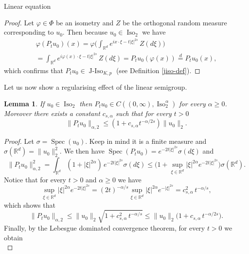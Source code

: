 \documentclass[a4paper,10pt,fleqn]{amsart}
\newtheorem{lemma}[theorem]{Lemma}
\theoremstyle{remark}
\theoremstyle{definition}
\DeclareMathOperator{\Iso}{Iso}
\DeclareMathOperator{\JIso}{J-Iso}
\DeclareMathOperator{\Spec}{Spec}
\newcommand{\X} {{\mathbb{R}^d}}
\renewcommand{\phi} {\varphi}
\renewcommand{\=} {\overset{d}{=}}
\begin{document}
\begin{section}{Linear equation}
\begin{proof}
      Let $\phi\in\Phi$ be an isometry and $Z$ be the orthogonal random measure corresponding to $u_0$. Then
      because $u_0\in\Iso_2$ we have
      \begin{multline*}
        \phi(P_tu_0)(x) = \phi\Big(\int_\X e^{ix\cdot\xi-t|\xi|^{2s}}\,Z(d\xi)\Big) \\=
        \int_\X e^{i\phi(x)\cdot\xi-t|\xi|^{2s}}\,Z(d\xi)  = P_t u_0(\phi(x)) \= P_t u_0(x),
      \end{multline*}
      which confirms that $P_tu_0\in\JIso_{K,p}$ (see Definition \ref{jiso-def}).
  \end{proof}
  Let us now show a regularising effect of the linear semigroup.
   \begin{lemma}\label{linear-regularity}
       If $u_0\in\Iso_2$ then $P_tu_0\in C((0,\infty),\Iso^\alpha_2)$ for every $\alpha\geq 0$. Moreover
       there exists a constant $c_{s,\alpha}$ such that for every $t>0$
       \begin{equation*}
        \|P_tu_0\|_{\alpha,2}\leq (1+c_{s,\alpha}t^{-\alpha/2s})\|u_0\|_{2}.
       \end{equation*}
      \end{lemma}
      \begin{proof}
        Let $\sigma = \Spec(u_0)$. Keep in mind it is a finite measure and $\sigma(\X) = \|u_0\|_2^2$.
        We then have $\Spec(P_tu_0) =  e^{-2t|\xi|^{2s}}\sigma(d\xi)$ and
        \begin{equation*}
          \|P_tu_0\|_{\alpha,2}^2 = \int_\X (1+|\xi|^{2\alpha})\, e^{-2t|\xi|^{2s}} \sigma(d\xi) 
          \leq \big(1+\sup_{\xi\in\X}|\xi|^{2\alpha} e^{-2t|\xi|^{2s}}\big)\sigma(\X).
        \end{equation*}
         Notice that for every $t>0$ and $\alpha\geq0$ we have
        \begin{equation}\label{cs}
          \sup_{\xi\in\X}|\xi|^{2\alpha} e^{-2t|\xi|^{2s}} = (2t)^{-\alpha/s}\sup_{\xi\in\X}|\xi|^{2\alpha} e^{-|\xi|^{2s}} = c_{s,\alpha}^2\,t^{-\alpha/s},
        \end{equation}
        which shows that
        \begin{equation*}
         \|P_tu_0\|_{\alpha,2}
         \leq \|u_0\|_{2}\sqrt{1+c_{s,\alpha}^2\,t^{-\alpha/s}}
         \leq \|u_0\|_{2}\big(1+c_{s,\alpha}\,t^{-\alpha/{2s}}\big).
        \end{equation*}
        Finally, by the Lebesgue dominated convergence theorem, for every $t>0$ we obtain
         \begin{equation*}

\end{equation*}
\end{proof}
\end{section}
\end{document}
